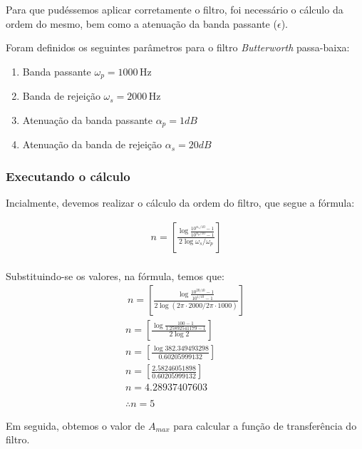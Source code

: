Para que pudéssemos aplicar corretamente o filtro, foi necessário o cálculo da ordem do mesmo, bem como a atenuação da banda passante ($\epsilon$).

Foram definidos os seguintes parâmetros para o filtro \textit{Butterworth} passa-baixa:

\begin{enumerate}
    \item Banda passante $\omega_p=1000 \, \text{Hz}$
    \item Banda de rejeição $\omega_s = 2000\, \text{Hz}$
    \item Atenuação da banda passante $\alpha_p = 1dB$
    \item Atenuação da banda de rejeição $\alpha_s = 20dB$
\end{enumerate}


\subsubsection*{Executando o cálculo}
Incialmente, devemos realizar o cálculo da ordem do filtro, que segue a fórmula:

\begin{align} \
    n = \left[ \frac{\log{\frac{10^{\alpha_s/10}- 1}{10^{\alpha_p/10}-1}}}{2\log{\omega_s/\omega_p}} \right] \\
    \label{eq:butterworth_n_formula}
\end{align}

Substituindo-se os valores, na fórmula, temos que:
\begin{align*} \
    n = \left[ \frac{\log{\frac{10^{20/10}- 1}{10^{1/10}-1}}}{2\log{(2\pi \cdot2000/2\pi\cdot 1000)}} \right] \\
    n = \left[ \frac{\log{\frac{100- 1}{1.25892541179-1}}}{2\log{2}} \right]                                  \\
    n = \left[ \frac{\log{382.349493298}}{0.60205999132} \right]                                              \\
    n = \left[ \frac{2.58246051898}{0.60205999132} \right]                                                    \\
    n = 4.28937407603                                                                                         \\
    \\
    \therefore n = 5
\end{align*}


Em seguida, obtemos o valor de $A_{max}$ para calcular a função de transferência do filtro.

